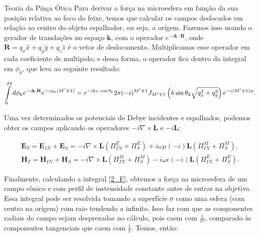 \begin{chapter}{Teoria da Pinça Ótica}
Para derivar a força na microesfera em função da sua posição relativa ao foco do feixe, temos que calcular os campos deslocados em relação ao centro do objeto espalhador, ou seja, a orígem. Fazemos isso usando o gerador de translações no espaço ${\mathbf k}$, com o operador $e^{-i{\mathbf k}\cdot{\mathbf R}}$, onde ${\mathbf R}=q_x\hat{x}+q_y\hat{y}+q_z\hat{z}$ é o vetor de deslocamento. Multiplicamos esse operador em cada coeficiente de multipolo, e dessa forma, o operador fica dentro da integral em $\phi_k$, que leva ao seguinte resultado:

\begin{equation}
\begin{split}
\int\limits_0^{2\pi} d\phi_k e^{-i{\mathbf k}\cdot{\mathbf R}} e^{-i\phi_k(M'\mp1)}=e^{-ik z\thinspace \cos\theta_k} 2\pi(-i)^{M'\mp1}J_{M'\mp1}\left(k\sin\theta_k\sqrt{q_x^2+q_y^2}\right)e^{-i(M'\mp1)\phi}.
\label{int_phi}
\end{split}
\end{equation}
%

Uma vez determinados os potenciais de Debye incidentes e espalhados, podemos obter os campos aplicando os operadores $-i\nabla\times{\mathbf L}$ e $-i{\mathbf L}$:

\begin{equation}
\begin{split}
{\mathbf E}_T={\mathbf E}_{IN}+{\mathbf E}_{S}=-i\nabla\times{\mathbf L}(\Pi^E_{IN}+\Pi^E_S)+i \omega \mu(-i){\mathbf L}(\Pi^M_{IN}+\Pi^M_S), \\
{\mathbf H}_T={\mathbf H}_{IN}+{\mathbf H}_{S}=-i\nabla\times{\mathbf L}(\Pi^M_{IN}+\Pi^M_S)-i \omega \epsilon(-i){\mathbf L}(\Pi^E_{IN}+\Pi^E_S).
\end{split}
\end{equation}
%

Finalmente, calculando a integral \ref{2_F}, obtemos a força na microesfera de um campo cônico e com perfil de instensidade constante antes de entrar na objetiva. Essa integral pode ser resolvida tomando a superfície $\sigma$ como uma esfera (com centro na orígem) com raio tendendo a infinito. Isso faz com que as componentes radiais do campo sejam desprezadas no cálculo, pois caem com $\frac{1}{r^2}$, comparado às componentes tangenciais que caem com $\frac{1}{r}$. Temos, então:


\end{chapter}
